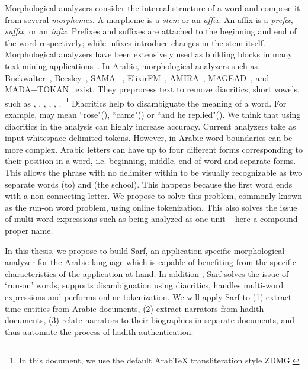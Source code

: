 \documentclass[a4,12pt]{report}
\newcommand{\noTrRL}[1]{\transfalse\RL{#1}\transtrue}
\newcommand{\noTrnoVocRL}[1]{\transfalse\novocalize\noTrRL{#1}\vocalize\transtrue}
\newcommand{\noVocRL}[1]{\transtrue\novocalize\RL{#1}\vocalize}
\begin{document}
Morphological analyzers %
consider the internal structure of a word and compose it from
several {\em morphemes}. 
A morpheme is a {\em stem} or an {\em affix}.
An affix is a {\em prefix, suffix,} or an {\em infix}.
Prefixes and suffixes are attached to the beginning and end of the word respectively; 
while infixes introduce changes in the stem itself. 
Morphological analyzers have been extensively used as building blocks 
in many text mining applications~\cite{Sou07}.  In Arabic, morphological analyzers such as  
Buckwalter~\cite{Buckwalter:02},
Beesley~\cite{Beesley:01},
SAMA ~\cite{Kulick:10},
ElixirFM~\cite{Otakar:07}, 
AMIRA~\cite{Diab:07,Benajiba:07},
MAGEAD~\cite{Habash:05}, 
and MADA+TOKAN~\cite{Habash:09}
exist.
They preprocess text to remove diacritics, short vowels, such as 
, , , , , .~\footnote{In this document, 
we use the default ArabTeX transliteration style ZDMG.} Diacritics help to disambiguate the
meaning of a word. For example, \noVocRL{wrd} may mean ``rose"(), ``came"(\fullvocalize{}) 
or ``and he replied"(). We think that using diacritics in the analysis can highly increase accuracy.
Current analyzers take as input whitespace-delimited tokens. However, in Arabic word boundaries can be more complex.
Arabic letters can have up to 
four different forms
corresponding to their position in a word, i.e. beginning,
middle, end of word and separate forms. 
This allows the phrase
\noTrnoVocRL{il_A\nospace almdrsT}  with no delimiter within
to be visually recognizable
as two separate words \noVocRL{il_A} (to) and \noVocRL{almdrsT} (the school).
This happens because the first word \noVocRL{il_A} ends with
\noVocRL{_A} a non-connecting letter. We propose to solve this problem, commonly known as the run-on word problem, using online tokenization.
This also solves the issue of multi-word expressions such as \noVocRL{`abid al-la.tiyf} being analyzed as one unit -- here a compound proper name.


In this thesis, we propose to build Sarf, an application-specific 
morphological analyzer for the Arabic language 
which is capable of benefiting
from the specific characteristics of the application at hand.
In addition , Sarf solves the issue of `run-on' words, supports disambiguation using diacritics, 
handles multi-word expressions and performs online tokenization. 
We will apply Sarf to  
(1) extract time entities from Arabic documents,
(2) extract narrators from hadith documents,
(3) relate narrators to their biographies in separate documents, and 
 thus automate the process of hadith authentication.
\end{document}
